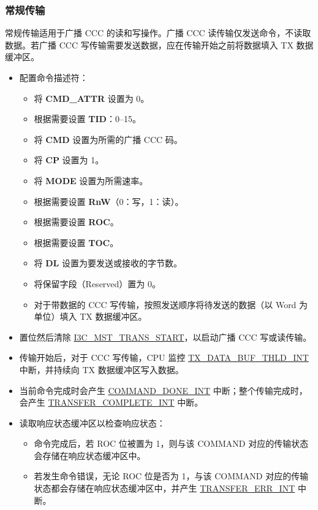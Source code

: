 \documentclass[main\_\_CN.tex]{subfiles}
\begin{document}
\subsubsection{常规传输}
常规传输适用于广播 CCC 的读和写操作。广播 CCC 读传输仅发送命令，不读取数据。若广播 CCC 写传输需要发送数据，应在传输开始之前将数据填入 TX 数据缓冲区。

\begin{itemize}
    \item 配置命令描述符：
    \begin{itemize}
        \item 将 \textbf{CMD\_ATTR} 设置为 0。
        \item 根据需要设置 \textbf{TID}：0–15。
        \item 将 \textbf{CMD} 设置为所需的广播 CCC 码。
        \item 将 \textbf{CP} 设置为 1。
        \item 将 \textbf{MODE} 设置为所需速率。
        \item 根据需要设置 \textbf{RnW}（0：写，1：读）。
        \item 根据需要设置 \textbf{ROC}。
        \item 根据需要设置 \textbf{TOC}。
        \item 将 \textbf{DL} 设置为要发送或接收的字节数。
        \item 将保留字段（Reserved）置为 0。
        \item 对于带数据的 CCC 写传输，按照发送顺序将待发送的数据（以 Word 为单位）填入 TX 数据缓冲区。
    \end{itemize}
    \item 置位然后清除 \hyperref[fielddesc:I3CMSTREGTRANSSTART]{I3C\_MST\_TRANS\_START}，以启动广播 CCC 写或读传输。
    \item 传输开始后，对于 CCC 写传输，CPU 监控 \hyperref[int:TXDATABUFTHLDINT]{TX\_DATA\_BUF\_THLD\_INT} 中断，并持续向 TX 数据缓冲区写入数据。
    \item 当前命令完成时会产生 \hyperref[int:COMMANDDONEINT]{COMMAND\_DONE\_INT} 中断；整个传输完成时，会产生 \hyperref[int:TRANSFERCOMPLETEINT]{TRANSFER\_COMPLETE\_INT} 中断。
    \item 读取响应状态缓冲区以检查响应状态：
    \begin{itemize}
        \item 命令完成后，若 ROC 位被置为 1，则与该 COMMAND 对应的传输状态会存储在响应状态缓冲区中。
        \item 若发生命令错误，无论 ROC 位是否为 1，与该 COMMAND 对应的传输状态都会存储在响应状态缓冲区中，并产生 \hyperref[int:TRANSFERERRINT]{TRANSFER\_ERR\_INT} 中断。
    \end{itemize}
\end{itemize}
\end{document}
